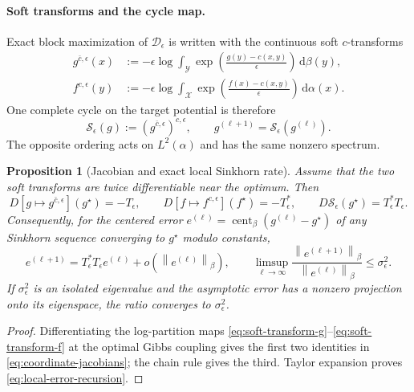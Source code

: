 \documentclass[11pt]{article}
\newtheorem{proposition}{Proposition}[section]
\theoremstyle{definition}
\theoremstyle{remark}
\newcommand{\eps}{\epsilon}
\newcommand{\al}{\alpha}
\newcommand{\be}{\beta}
\newcommand{\Xx}{\mathcal{X}}
\newcommand{\Yy}{\mathcal{Y}}
\newcommand{\Dd}{\mathcal{D}}
\newcommand{\Ss}{\mathcal{S}}
\newcommand{\dd}{\,\mathrm{d}}
\newcommand{\norm}[1]{\left\lVert #1\right\rVert}
\begin{document}
\paragraph{Soft transforms and the cycle map.}
Exact block maximization of $\Dd_\eps$ is written with the continuous
soft $c$-transforms
\begin{align}
  g^{\bar c,\eps}(x)
  &:=-\eps\log\int_{\Yy}
  \exp\left(\frac{g(y)-c(x,y)}{\eps}\right)\dd\be(y),
  \label{eq:soft-transform-g}
  \\
  f^{c,\eps}(y)
  &:=-\eps\log\int_{\Xx}
  \exp\left(\frac{f(x)-c(x,y)}{\eps}\right)\dd\al(x).
  \label{eq:soft-transform-f}
\end{align}
One complete cycle on the target potential is therefore
\begin{equation}
  \label{eq:sinkhorn-cycle}
  \Ss_\eps(g):=(g^{\bar c,\eps})^{c,\eps},
  \qquad
  g^{(\ell+1)}=\Ss_\eps(g^{(\ell)}).
\end{equation}
The opposite ordering acts on $L^2(\al)$ and has the same nonzero
spectrum.

\begin{proposition}[Jacobian and exact local Sinkhorn rate]
  \label{prop:sinkhorn-local-rate}
  Assume that the two soft transforms are twice differentiable near
  the optimum. Then
  \begin{equation}
    \label{eq:coordinate-jacobians}
    D[g\mapsto g^{\bar c,\eps}](g^\star)=-T_\eps,
    \qquad
    D[f\mapsto f^{c,\eps}](f^\star)=-T_\eps^\ast,
    \qquad
    D\Ss_\eps(g^\star)=T_\eps^\ast T_\eps.
  \end{equation}
  Consequently, for the centered error
  $e^{(\ell)}=\operatorname{cent}_{\be}(g^{(\ell)}-g^\star)$ of any Sinkhorn sequence
  converging to $g^\star$ modulo constants,
  \begin{equation}
    \label{eq:local-error-recursion}
    e^{(\ell+1)}
    =
    T_\eps^\ast T_\eps e^{(\ell)}+o(\norm{e^{(\ell)}}_\be),
    \qquad
    \limsup_{\ell\to\infty}
    \frac{\norm{e^{(\ell+1)}}_\be}
         {\norm{e^{(\ell)}}_\be}
    \leq \sigma_\eps^2.
  \end{equation}
  If $\sigma_\eps^2$ is an isolated eigenvalue and the asymptotic error
  has a nonzero projection onto its eigenspace, the ratio converges to
  $\sigma_\eps^2$.
\end{proposition}

\begin{proof}
Differentiating the log-partition maps
\eqref{eq:soft-transform-g}--\eqref{eq:soft-transform-f} at the optimal
Gibbs coupling gives the first two identities in
\eqref{eq:coordinate-jacobians}; the
chain rule gives the third. Taylor expansion proves
\eqref{eq:local-error-recursion}.
\end{proof}
\end{document}
